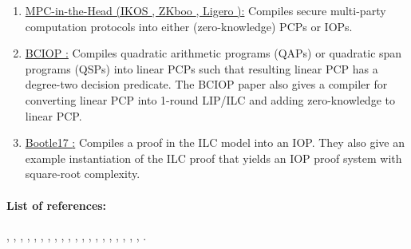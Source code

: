 	\begin{enumerate}[label=\alph*.]
  
	\item \underline{MPC-in-the-Head (IKOS \cite{2007:stoc:ZK-from-SMPC}, ZKboo \cite{2016:Sec:ZKBoo}, Ligero \cite{2017:ccs:ligero}):} 
	Compiles secure multi-party computation protocols into either (zero-knowledge) PCPs or IOPs.
  
	\item \underline{BCIOP \cite{2013:tcc:snargs-via-LIPs}:} 
	Compiles quadratic arithmetic programs (QAPs) or quadratic span programs (QSPs) into linear PCPs such that resulting linear PCP has a degree-two decision predicate. 
	The BCIOP paper also gives a compiler for converting linear PCP into 1-round LIP/ILC and adding zero-knowledge to linear PCP.
  
	\item \underline{Bootle17 \cite{2017:asiacrypt:linear-time-zkps-for-arithmetic}:} 
	Compiles a proof in the ILC model into an IOP.
	They also give an example instantiation of the ILC proof that yields an IOP proof system with square-root complexity.
	
	\end{enumerate}



\paragraph{List of references:}
\cite{2013:tcc:snargs-via-LIPs},
\cite{2016:tcc:IOPs},
\cite{2017:eurocrypt:lattice-based-snargs},
\cite{2016:eurocrypt:efficient-zk-args-for-arithmetic},
\cite{2017:asiacrypt:linear-time-zkps-for-arithmetic},
\cite{2018:asiacrypt:arya-nearly-lineat-time-zkps-for-correct},
\cite{1998:crypto:zkps-for-finite-field-arithmetic},
\cite{2013:QSPs-and-succinct-NIZKs-without-PCPs},
\cite{2015:JACM:delegating-computation-interactive-proofs-for-muggles},
\cite{2010:asiacrypt:short-NIZKPs},
\cite{2018:SP:Doubly-efficient-zkSNARKs-without-trusted-setup},
\cite{2007:stoc:ZK-from-SMPC},
\cite{2012:tcc:On-Efficient-ZK-PCPs},
\cite{1995:crypto:Improved-Efficient-Arguments},
\cite{2008:icalp:interactive-PCP},
\cite{2017:ccs:ligero},
\cite{2000:SIAM:Computationally-Sound-Proofs},
\cite{2016:stoc:Constant-round-Interactive-Proofs-for-Delegating-Computation},
\cite{2018:SP:vRAM},
\cite{2017:SP:vSQL},
\cite{2016:Sec:ZKBoo}.


